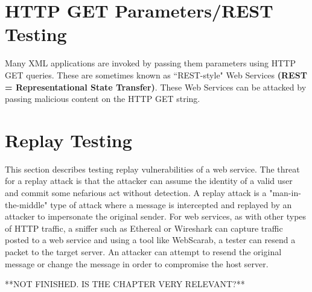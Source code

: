 	\section{HTTP GET Parameters/REST Testing}

		Many XML applications are invoked by passing them parameters using HTTP GET queries. 
		These are sometimes known as “REST-style" Web Services 
		{\bf (REST = Representational State Transfer)}. These Web Services can be attacked by 
		passing malicious content on the HTTP GET string. 

	\section{Replay Testing}

		This section describes testing replay vulnerabilities of a web service. The threat for a replay 
		attack is that the attacker can assume the identity of a valid user and commit some nefarious act
		without detection. A replay attack is a "man-in-the-middle" type of attack where a message is 
		intercepted and replayed by an attacker to impersonate the original sender. For web services, as 
		with other types of HTTP traffic, a sniffer such as Ethereal or Wireshark can capture traffic 
		posted to a web service and using a tool like WebScarab, a tester can resend a packet to the
		target server. An attacker can attempt to resend the original message or change the message in 
		order to compromise the host server.

{\color{red} **NOT FINISHED. IS THE CHAPTER VERY RELEVANT?**}



